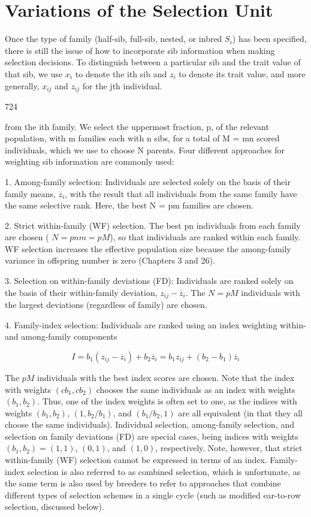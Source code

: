 \documentclass{article}
\begin{document}
\section{Variations of the Selection Unit}
Once the type of family (half-sib, full-sib, nested, or inbred  $ S_i $) has been specified, there is still the issue of how to incorporate sib information when making selection decisions. To distinguish between a particular sib and the trait value of that sib, we use  $ x_i $ to denote the ith sib and  $ z_i $ to denote its trait value, and more generally,  $ x_{ij} $ and  $ z_{ij} $ for the jth individual.

724

from the ith family. We select the uppermost fraction, p, of the relevant population, with m families each with n sibs, for a total of M = mn scored individuals, which we use to choose N parents. Four different approaches for weighting sib information are commonly used:

1. Among-family selection: Individuals are selected solely on the basis of their family means,  $ \overline{z}_{i} $, with the result that all individuals from the same family have the same selective rank. Here, the best N = pm families are chosen.

2. Strict within-family (WF) selection. The best pn individuals from each family are chosen ( $ N = pnm = pM $), so that individuals are ranked within each family. WF selection increases the effective population size because the among-family variance in offspring number is zero (Chapters 3 and 26).

3. Selection on within-family deviations (FD): Individuals are ranked solely on the basis of their within-family deviation,  $ z_{ij} - \overline{z}_i $. The  $ N = pM $ individuals with the largest deviations (regardless of family) are chosen.

4. Family-index selection: Individuals are ranked using an index weighting within- and among-family components

\begin{equation}
I=b_{1}\left(z_{i j}-\overline{z}_{i}\right)+b_{2}\overline{z}_{i}=b_{1}z_{i j}+\left(b_{2}-b_{1}\right)\overline{z}_{i}
\end{equation}

The  $ pM $ individuals with the best index scores are chosen. Note that the index with weights  $ (cb_1, cb_2) $ chooses the same individuals as an index with weights  $ (b_1, b_2) $. Thus, one of the index weights is often set to one, as the indices with weights  $ (b_1, b_2) $,  $ (1, b_2/b_1) $, and  $ (b_1/b_2, 1) $ are all equivalent (in that they all choose the same individuals). Individual selection, among-family selection, and selection on family deviations (FD) are special cases, being indices with weights  $ (b_1, b_2) = (1,1) $,  $ (0,1) $, and  $ (1,0) $, respectively. Note, however, that strict within-family (WF) selection cannot be expressed in terms of an index. Family-index selection is also referred to as combined selection, which is unfortunate, as the same term is also used by breeders to refer to approaches that combine different types of selection schemes in a single cycle (such as modified ear-to-row selection, discussed below).
\end{document}
